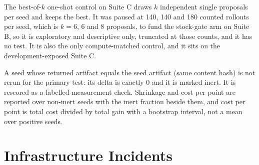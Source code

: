 The best-of-$k$ one-shot control on Suite C draws $k$ independent single proposals per seed and keeps the best. It was paused at 140, 140 and 180 counted rollouts per seed, which is $k=6$, 6 and 8 proposals, to fund the stock-gate arm on Suite B, so it is exploratory and descriptive only, truncated at those counts, and it has no test. It is also the only compute-matched control, and it sits on the development-exposed Suite C.

A seed whose returned artifact equals the seed artifact (same content hash) is not rerun for the primary test: its delta is exactly 0 and it is marked inert. It is rescored as a labelled measurement check. Shrinkage and cost per point are reported over non-inert seeds with the inert fraction beside them, and cost per point is total cost divided by total gain with a bootstrap interval, not a mean over positive seeds.

\section{Infrastructure Incidents}
\label{app:incidents}

